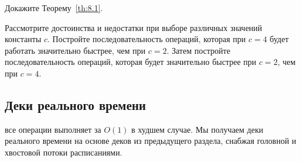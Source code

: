 \begin{exercise}\label{ex:8.5}
  Докажите Теорему~\ref{th:8.1}.
\end{exercise}

\begin{exercise}\label{ex:8.6}
  Рассмотрите достоинства и недостатки при выборе различных значений
  константы $c$. Постройте последовательность операций, которая при $c
  = 4$ будет работать значительно быстрее, чем при $c = 2$. Затем
  постройте последовательность операций, которая будет значительно
  быстрее при $c = 2$, чем при $c = 4$.
\end{exercise}

\subsection{Деки реального времени}
\label{sc:8.4.3}

 все операции выполняет
за $O(1)$ в худшем случае. Мы получаем деки реального времени на
основе деков из предыдущего раздела, снабжая головной и хвостовой
потоки расписаниями.

